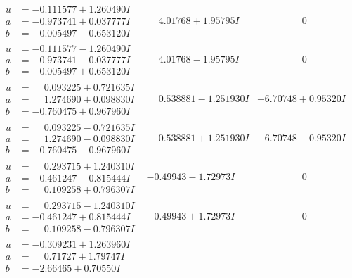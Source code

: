 \documentclass[1p]{elsarticle_modified}
\theoremstyle{definition}
\begin{document}
$$\begin{array}{c|c|c}
\begin{aligned}
u &= -0.111577 + 1.260490 I \\
a &= -0.973741 + 0.037777 I \\
b &= -0.005497 - 0.653120 I\end{aligned}
 & \phantom{-}4.01768 + 1.95795 I & \phantom{-0.000000 } 0 \\ \hline\begin{aligned}
u &= -0.111577 - 1.260490 I \\
a &= -0.973741 - 0.037777 I \\
b &= -0.005497 + 0.653120 I\end{aligned}
 & \phantom{-}4.01768 - 1.95795 I & \phantom{-0.000000 } 0 \\ \hline\begin{aligned}
u &= \phantom{-}0.093225 + 0.721635 I \\
a &= \phantom{-}1.274690 + 0.098830 I \\
b &= -0.760475 + 0.967960 I\end{aligned}
 & \phantom{-}0.538881 - 1.251930 I & -6.70748 + 0.95320 I \\ \hline\begin{aligned}
u &= \phantom{-}0.093225 - 0.721635 I \\
a &= \phantom{-}1.274690 - 0.098830 I \\
b &= -0.760475 - 0.967960 I\end{aligned}
 & \phantom{-}0.538881 + 1.251930 I & -6.70748 - 0.95320 I \\ \hline\begin{aligned}
u &= \phantom{-}0.293715 + 1.240310 I \\
a &= -0.461247 - 0.815444 I \\
b &= \phantom{-}0.109258 + 0.796307 I\end{aligned}
 & -0.49943 - 1.72973 I & \phantom{-0.000000 } 0 \\ \hline\begin{aligned}
u &= \phantom{-}0.293715 - 1.240310 I \\
a &= -0.461247 + 0.815444 I \\
b &= \phantom{-}0.109258 - 0.796307 I\end{aligned}
 & -0.49943 + 1.72973 I & \phantom{-0.000000 } 0 \\ \hline\begin{aligned}
u &= -0.309231 + 1.263960 I \\
a &= \phantom{-}0.71727 + 1.79747 I \\
b &= -2.66465 + 0.70550 I\end{aligned}

\end{array}$$
\end{document}
